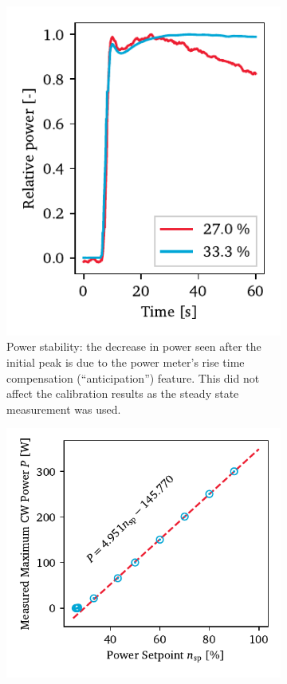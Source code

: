             \begin{figure}[h]
                \centering
                \begin{subfigure}[t]{2.5in}
                    \centering
                    \includegraphics[]{assets/3 design/cw_power_time}
                    \caption{Power stability: the decrease in power seen after the initial peak is due to the power meter's rise time compensation (``anticipation'') feature. This did not affect the calibration results as the steady state measurement was used.}
                    \label{fig:cw_tests_time}
                \end{subfigure}
                \hfill
                \begin{subfigure}[t]{3.3in}
                    \centering
                    \includegraphics[]{assets/3 design/cw_power_setpoint}

\end{subfigure}
\end{figure}
